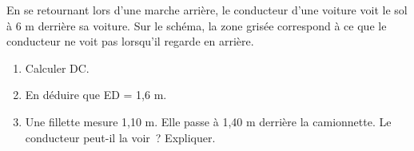 \documentclass[exercice]{thedocument}%
\begin{document}
%
En se retournant lors d'une marche arrière, le conducteur d'une voiture voit
le sol à 6 m derrière sa voiture. Sur le schéma, la zone grisée correspond à ce
que le conducteur ne voit pas lorsqu'il regarde en arrière.
\vskip10pt{\centering{}\par}
\begin{enumerate}
    \item Calculer DC.
    \item En déduire que ED = 1,6 m.
    \item Une fillette mesure 1,10 m. Elle passe à 1,40 m derrière la
    camionnette. Le conducteur peut-il la voir~? Expliquer.
\end{enumerate}
\end{document}
